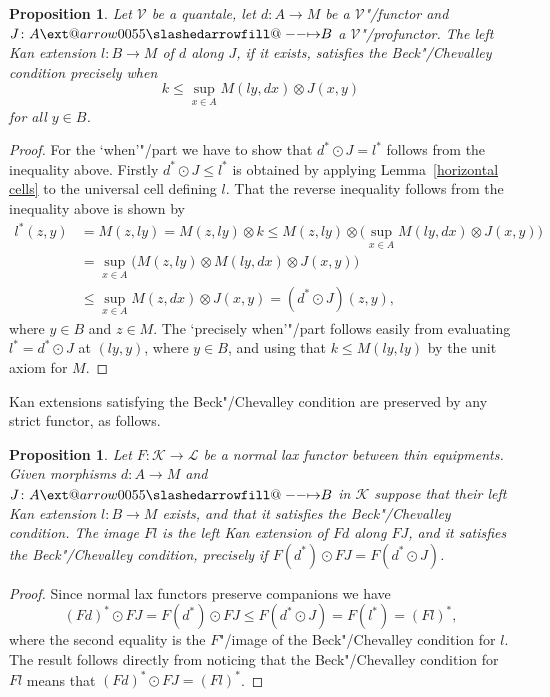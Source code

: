 \documentclass[preprint, a4paper]{elsarticle}
\makeatletter
\def\slashedarrowfill@#1#2#3#4#5{%
  $\m@th\thickmuskip0mu\medmuskip\thickmuskip\thinmuskip\thickmuskip
   \relax#5#1\mkern-7mu%
   \cleaders\hbox{$#5\mkern-2mu#2\mkern-2mu$}\hfill
   \mathclap{#3}\mathclap{#2}%
   \cleaders\hbox{$#5\mkern-2mu#2\mkern-2mu$}\hfill
   \mkern-7mu#4$%
}
\def\rightslashedarrowfill@{%
  \slashedarrowfill@\relbar\relbar\mapstochar\rightarrow}
\newcommand\xslashedrightarrow[2][]{%
  \ext@arrow 0055{\rightslashedarrowfill@}{#1}{#2}}
\def\slashedrightarrow{\xslashedrightarrow{}}
\newtheorem{proposition}[theorem]{Proposition}
\theoremstyle{definition}
\theoremstyle{remark}
\providecommand{\lemref}[1]{Lemma~\ref{#1}}
\providecommand{\tens}{\otimes}
\providecommand{\bigpars}[1]{\bigl(#1\bigr)}
\providecommand{\map}[3]{#1\colon#2\to#3}
\providecommand{\hmap}[3]{#1\colon#2\slashedrightarrow#3}
\providecommand{\catvar}[1]{\mathcal{#1}}
\providecommand{\2}{\mathsf 2}
\providecommand{\K}{\catvar K}
\providecommand{\V}{\catvar V}
\providecommand{\hc}{\odot}
\makeatother
\begin{document}
  \begin{proposition}\label{Beck-Chevalley condition}
  	Let $\V$ be a quantale, let $\map dAM$ be a $\V$"/functor and $\hmap JAB$ a $\V$"/profunctor. The left Kan extension $\map lBM$ of $d$ along $J$, if it exists, satisfies the Beck"/Chevalley condition precisely when
  	\begin{displaymath}
  		k \leq \sup_{x \in A} M(ly, dx) \tens J(x, y)
  	\end{displaymath}
  	for all $y \in B$.
  \end{proposition}
  \begin{proof}
  	For the `when'"/part we have to show that $d^* \hc J = l^*$ follows from the inequality above. Firstly $d^* \hc J \leq l^*$ is obtained by applying \lemref{horizontal cells} to the universal cell defining $l$. That the reverse inequality follows from the inequality above is shown by
  	\begin{align*}
  		l^*(z, y) &= M(z, ly) = M(z, ly) \tens k \leq M(z, ly) \tens \bigpars{\sup_{x \in A} M(ly, dx) \tens J(x,y)} \\
  		&= \sup_{x\in A} \bigpars{M(z, ly) \tens M(ly, dx) \tens J(x, y)} \\
  		&\leq \sup_{x \in A} M(z, dx) \tens J(x, y) = (d^* \hc J)(z, y),
  	\end{align*}
  	where $y \in B$ and $z \in M$. The `precisely when'"/part follows easily from evaluating $l^* = d^* \hc J$ at $(ly, y)$, where $y \in B$, and using that $k \leq M(ly, ly)$ by the unit axiom for $M$.
  \end{proof}
  
  Kan extensions satisfying the Beck"/Chevalley condition are preserved by any strict functor, as follows.
  \begin{proposition} \label{image of Kan extension satisfying Beck-Chevalley}
  	Let $\map F\K\mathcal L$ be a normal lax functor between thin equipments. Given morphisms $\map dAM$ and $\hmap JAB$ in $\K$ suppose that their left Kan extension $\map lBM$ exists, and that it satisfies the Beck"/Chevalley condition. The image $Fl$ is the left Kan extension of $Fd$ along $FJ$, and it satisfies the Beck"/Chevalley condition, precisely if $F(d^*) \hc FJ = F(d^* \hc J)$.
  \end{proposition} 
	\begin{proof}
		Since normal lax functors preserve companions we have
		\begin{displaymath}
			(Fd)^* \hc FJ = F(d^*) \hc FJ \leq F(d^* \hc J) = F(l^*) = (Fl)^*,
		\end{displaymath}
		where the second equality is the $F$"/image of the Beck"/Chevalley condition for $l$. The result follows directly from noticing that the Beck"/Chevalley condition for $Fl$ means that $(Fd)^* \hc FJ = (Fl)^*$.
	\end{proof}
  
\end{document}
